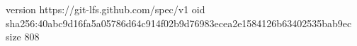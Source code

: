 version https://git-lfs.github.com/spec/v1
oid sha256:40abc9d16fa5a05786d64c914f02b9d76983ecea2e1584126b63402535bab9ec
size 808
